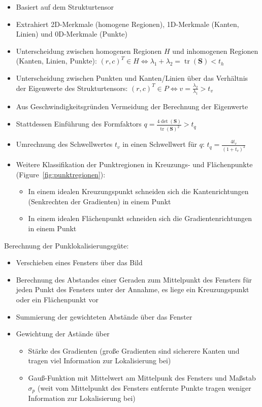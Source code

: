 \documentclass[11pt]{article}
\DeclareMathOperator{\tr}{tr} %
\begin{document}
\begin{itemize}
    \item Basiert auf dem Strukturtensor
    \item Extrahiert 2D-Merkmale (homogene Regionen), 1D-Merkmale (Kanten, Linien) und 0D-Merkmale (Punkte)
    \item Unterscheidung zwischen homogenen Regionen $H$ und inhomogenen Regionen (Kanten, Linien, Punkte): $(r, c)^T \in H \Leftrightarrow \lambda_1 + \lambda_2 = \tr(\boldsymbol{S}) < t_h$
    \item Unterscheidung zwischen Punkten und Kanten/Linien über das Verhältnis der Eigenwerte des Strukturtensors: $(r, c)^T \in P \Leftrightarrow v = \frac{\lambda_2}{\lambda_1} > t_v$
    \item Aus Geschwindigkeitsgründen Vermeidung der Berechnung der Eigenwerte
    \item Stattdessen Einführung des Formfaktors $q = \frac{4 \det(\boldsymbol{S})}{\tr(\boldsymbol{S})^2} > t_q$
    \item Umrechnung des Schwellwertes $t_v$ in einen Schwellwert für $q$: $t_q = \frac{4 t_v}{(1 + t_v)^2}$
    \item Weitere Klassifikation der Punktregionen in Kreuzungs- und Flächenpunkte (Figure~\ref{fig:punktregionen}):
        \begin{itemize}
            \item In einem idealen Kreuzungspunkt schneiden sich die Kantenrichtungen (Senkrechten der Gradienten) in einem Punkt
            \item In einem idealen Flächenpunkt schneiden sich die Gradientenrichtungen in einem Punkt
        \end{itemize}
\end{itemize}

Berechnung der Punklokalisierungsgüte:
\begin{itemize}
    \item Verschieben eines Fensters über das Bild
    \item Berechnung des Abstandes einer Geraden zum Mittelpunkt des Fensters für jeden Punkt des Fensters unter der Annahme, es liege ein Kreuzungspunkt oder ein Flächenpunkt vor
    \item Summierung der gewichteten Abstände über das Fenster
    \item Gewichtung der Astände über
        \begin{itemize}
            \item Stärke des Gradienten (große Gradienten sind sicherere Kanten und tragen viel Information zur Lokalisierung bei)
            \item Gauß-Funktion mit Mittelwert am Mittelpunk des Fensters und Maßstab $\sigma_p$ (weit vom Mittelpunkt des Fensters entfernte Punkte tragen weniger Information zur Lokalisierung bei)
        \end{itemize}
\end{itemize}
\end{document}
